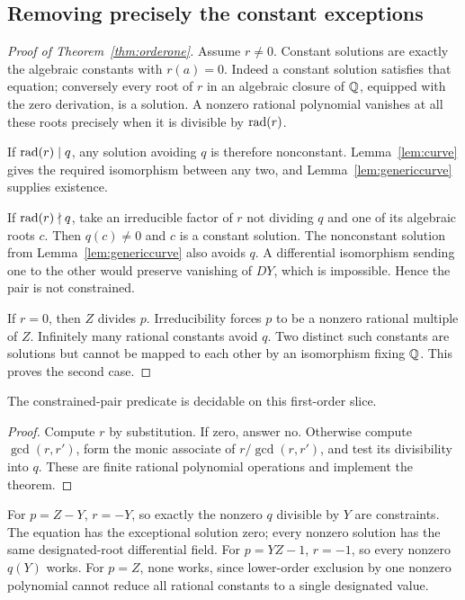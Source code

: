 \documentclass[11pt]{article}
\begin{document}
\subsection{Removing precisely the constant exceptions}

\begin{proof}[Proof of Theorem~\ref{thm:orderone}]
Assume $r\ne0$. Constant solutions are exactly the algebraic constants
with $r(a)=0$. Indeed a constant solution satisfies that equation;
conversely every root of $r$ in an algebraic closure of $\mathbb Q$, equipped
with the zero derivation, is a solution. A nonzero rational polynomial
vanishes at all these roots precisely when it is divisible by
$\operatorname{rad}(r)$.

If $\operatorname{rad}(r)\mid q$, any solution avoiding $q$ is therefore
nonconstant. Lemma~\ref{lem:curve} gives the required isomorphism
between any two, and Lemma~\ref{lem:genericcurve} supplies existence.

If $\operatorname{rad}(r)\nmid q$, take an irreducible factor of $r$ not dividing
$q$ and one of its algebraic roots $c$. Then $q(c)\ne0$ and $c$
is a constant solution. The nonconstant solution from
Lemma~\ref{lem:genericcurve} also avoids $q$. A differential isomorphism
sending one to the other would preserve vanishing of $DY$, which is
impossible. Hence the pair is not constrained.

If $r=0$, then $Z$ divides $p$. Irreducibility forces $p$ to be a
nonzero rational multiple of $Z$. Infinitely many rational constants
avoid $q$. Two distinct such constants are solutions but cannot be
mapped to each other by an isomorphism fixing $\mathbb Q$. This proves
the second case.
\end{proof}

\begin{corollary}\label{cor:algorithmone}
The constrained-pair predicate is decidable on this first-order slice.
\end{corollary}
\begin{proof}
Compute $r$ by substitution. If zero, answer no. Otherwise compute
$\gcd(r,r')$, form the monic associate of $r/\gcd(r,r')$, and test
its divisibility into $q$. These are finite rational polynomial
operations and implement the theorem.
\end{proof}

\begin{example}
For $p=Z-Y$, $r=-Y$, so exactly the nonzero $q$ divisible by $Y$
are constraints. The equation has the exceptional solution zero;
every nonzero solution has the same designated-root differential field.
For $p=YZ-1$, $r=-1$, so every nonzero $q(Y)$ works. For $p=Z$,
none works, since lower-order exclusion by one nonzero polynomial
cannot reduce all rational constants to a single designated value.
\end{example}
\end{document}
